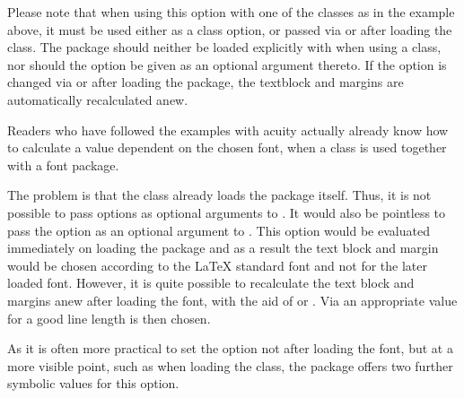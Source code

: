 Please note that when using this option with one of the {\KOMAScript} classes
as in the example above, it must be used either as a class option, or passed
via  or
 after loading the class. The
 package should neither be loaded explicitly with
 when using a {\KOMAScript} class, nor
should the option be given as an optional argument thereto. If the option is
changed via  or
 after loading the package, the textblock
and margins are automatically recalculated anew.%
%
\EndIndexGroup


\begin{Declaration}
\end{Declaration}%
Readers who have followed the
examples with acuity actually already know how to calculate a
 value dependent on the chosen font, when a {\KOMAScript}
class is used together with a font package.

\begin{Explain}
  The problem is that the {\KOMAScript} class already loads the
   package itself. Thus, it is not possible to pass options
  as optional arguments to . It would also
  be pointless to pass the  option as an
  optional argument to . This option
  would be evaluated immediately on loading the  package and
  as a result the text block and margin would be chosen according to the
  {\LaTeX} standard font and not for the later loaded font. However, it is
  quite possible to recalculate the text block and margins anew after loading
  the font, with the aid of %
   or
  . Via
   an appropriate  value for a good line length is then
  chosen.

  As it is often more practical to set the  option not
  after loading the font, but at a more visible point, such as when
  loading the class, the  package offers two further
  symbolic values for this option.
\end{Explain}

